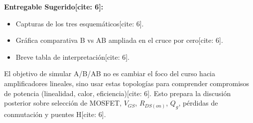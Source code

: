 \documentclass[11pt, a4paper]{article}
\begin{document}
\textbf{Entregable Sugerido[cite: 6]:}
\begin{itemize}
    \item Capturas de los tres esquemáticos[cite: 6].
    \item Gráfica comparativa B vs AB ampliada en el cruce por cero[cite: 6].
    \item Breve tabla de interpretación[cite: 6].
\end{itemize}

\vspace{0.5cm}
\begin{tcolorbox}[colback=white, colframe=gray, title=\textbf{Relación Curricular (Transición a MOSFET) {[cite: 6]}}]
    El objetivo de simular A/B/AB no es cambiar el foco del curso hacia amplificadores lineales, sino usar estas topologías para comprender compromisos de potencia (linealidad, calor, eficiencia)[cite: 6]. Esto prepara la discusión posterior sobre selección de MOSFET, $V_{GS}$, $R_{DS(on)}$, $Q_g$, pérdidas de conmutación y puentes H[cite: 6].
\end{tcolorbox}
\end{document}
